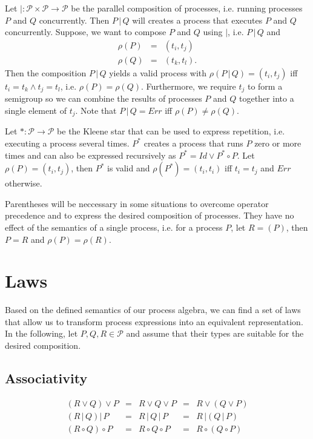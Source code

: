 Let $| \colon \mathcal{P} \times \mathcal{P} \to \mathcal{P}$ be the parallel composition of processes, i.e. running processes $P$ and $Q$ concurrently. Then $P \,|\, Q$ will creates a process that executes $P$ and $Q$ concurrently. Suppose, we want to compose $P$ and $Q$ using $|$, i.e. $P \,|\, Q$ and
\begin{eqnarray*}
  \rho \left( P \right) & = & \left( t_i, t_j \right) \\
  \rho \left( Q \right) & = & \left( t_k, t_l \right).
\end{eqnarray*}
Then the composition $P \,|\, Q$ yields a valid process with $\rho \left( P \,|\, Q \right) = \left( t_i, t_j \right)$ iff $t_i = t_k \wedge t_j = t_l$, i.e. $\rho \left( P \right) = \rho \left( Q \right)$. Furthermore, we require $t_j$ to form a semigroup so we can combine the results of processes $P$ and $Q$ together into a single element of $t_j$. Note that $P \,|\, Q = Err$ iff $\rho \left( P \right) \neq \rho \left( Q \right)$.

Let $* \colon \mathcal{P} \to \mathcal{P}$ be the Kleene star that can be used to express repetition, i.e. executing a process several times. $P^*$ creates a process that runs $P$ zero or more times and can also be expressed recursively as $P^* = Id \vee P^* \circ P$. Let $\rho \left( P \right) = \left( t_i, t_j \right)$, then $P^*$ is valid and $\rho \left( P^* \right) = \left( t_i, t_i \right)$ iff $t_i = t_j$ and $Err$ otherwise.

Parentheses will be neccessary in some situations to overcome operator precedence and to express the desired composition of processes. They have no effect of the semantics of a single process, i.e. for a process $P$, let $R = \left( P \right)$, then $P = R$ and $\rho \left( P \right) = \rho \left( R \right)$.

\section{Laws}
\label{chp:laws}
Based on the defined semantics of our process algebra, we can find a set of laws that allow us to transform process expressions into an equivalent representation. In the following, let $P, Q, R \in \mathcal{P}$ and assume that their types are suitable for the desired composition.

\subsection{Associativity}
\begin{equation*}
\begin{array}{rcccl}
  \left( R \vee Q \right) \vee P & = & R \vee Q \vee P & = & R \vee \left( Q \vee P \right) \\
  \left( R \,|\, Q \right) |\, P & = & R \,|\, Q \,|\, P & = & R \,| \left( Q \,|\, P \right) \\
  \left( R \circ Q \right) \circ P & = & R \circ Q \circ P & = & R \circ \left( Q \circ P \right)
\end{array}
\end{equation*}

